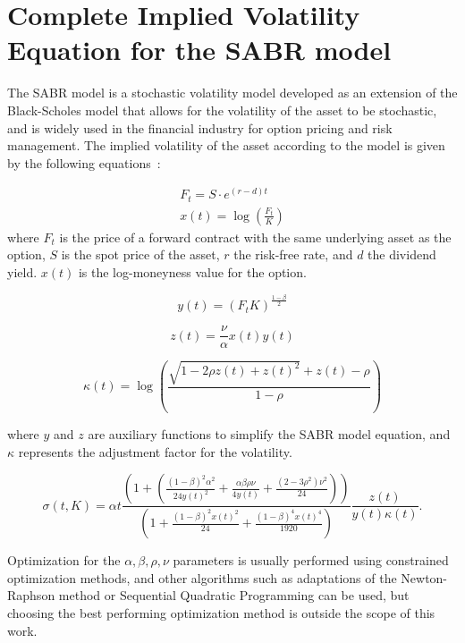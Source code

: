 \appendices


\section{Complete Implied Volatility Equation for the SABR model}
\label{sec:sabr}

The SABR model is a stochastic volatility model developed as an extension of the Black-Scholes
model that allows for the volatility of the asset to be stochastic,
and is widely used in the financial industry for option pricing and risk management.
The implied volatility of the asset according to the model is given by the following equations~\cite{Hagan2002}:

\begin{equation*}
    \begin{aligned}
        F_t = S \cdot e^{(r - d)t}\\
        x(t) = \log \left( \frac{F_t}{K} \right)
    \end{aligned}
\end{equation*}
where $F_t$ is the price of a forward contract with the same underlying asset as the option,
$S$ is the spot price of the asset, $r$ the risk-free rate, and $d$ the dividend yield.
$x(t)$ is the log-moneyness value for the option.

\[
    y(t) = \left(F_t K\right)^{\frac{1 - \beta}{2}}
\]

\[
    z(t) = \frac{\nu}{\alpha}x(t) y(t)
\]

\[
    \kappa (t) = \log \left( \frac{\sqrt{1 - 2 \rho z(t) + z(t)^2} + z(t) - \rho}{1 - \rho} \right)
\]

where $y$ and $z$ are auxiliary functions to simplify the SABR model equation,
and $\kappa$ represents the adjustment factor for the volatility.

\[
    \sigma (t, K) = \alpha t
    \frac{
        \left( 1 + \left( \frac{(1 - \beta)^2 \alpha^2}{24 y(t)^2} + \frac{\alpha \beta \rho \nu }{4 y(t)} + \frac{(2 - 3 \rho^2) \nu^2}{24} \right) \right)
    } {
        \left( 1 + \frac{(1 - \beta)^2 x(t)^2}{24} + \frac{(1 - \beta)^4 x(t)^4}{1920} \right)
    } \frac{z(t)}{y(t)\kappa (t)}.
\]

Optimization for the $\alpha, \beta, \rho, \nu$ parameters is usually performed using constrained optimization methods,
and other algorithms such as adaptations of the Newton-Raphson method or Sequential Quadratic Programming can be used,
but choosing the best performing optimization method is outside the scope of this work.

